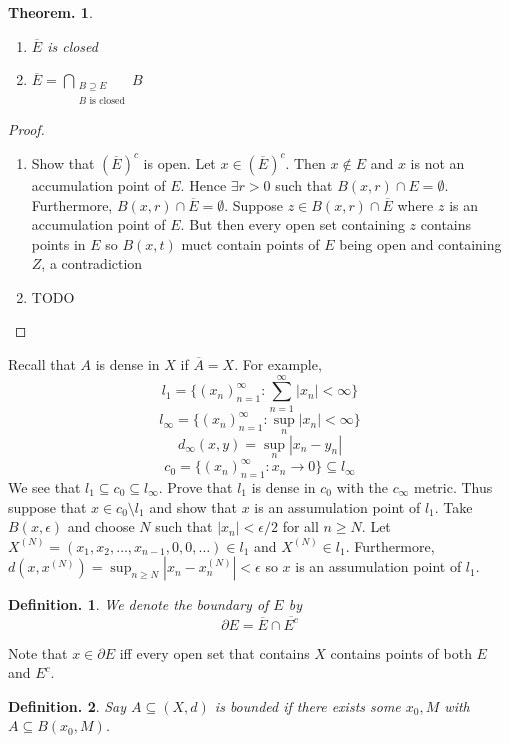 \documentclass[11pt, a4paper]{memoir}
\theoremstyle{change}
\newtheorem{theorem}{Theorem.}[section]
\theoremstyle{plain}
\theoremstyle{nonumberplain}
\newtheorem{definition}{Definition.}
\newtheorem{proof}{Proof}
\DeclareMathOperator{\B}{{\mathcal{B}}}
\numberwithin{equation}{section}
\begin{document}
\begin{theorem}\hspace{1cm}
    \begin{enumerate}
        \item $\overline{E}$ is closed
        \item $\displaystyle\overline{E}=\bigcap_{\substack{B\supseteq E\\B\text{ is closed}}}B$
    \end{enumerate}
\end{theorem}
\begin{proof}\hspace{1cm}
    \begin{enumerate}
        \item Show that $(\overline{E})^c$ is open. Let $x\in(\overline{E})^c$. Then $x\notin E$ and $x$ is not an accumulation
            point of $E$. Hence $\exists r>0$ such that $B(x,r)\cap E=\emptyset$. Furthermore, $B(x,r)\cap\overline{E}=\emptyset$.
            Suppose $z\in B(x,r)\cap\overline{E}$ where $z$ is an accumulation point of $E$. But then every open set
            containing $z$ contains points in $E$ so $B(x,t)$ muct contain points of $E$ being open and containing $Z$,
            a contradiction
        \item TODO
    \end{enumerate}
\end{proof}
Recall that $A$ is dense in $X$ if $\overline{A}=X$. For example,
\[l_1=\{(x_n)_{n=1}^\infty:\sum\limits_{n=1}^\infty|x_n|<\infty\}\]
\[l_\infty=\{(x_n)_{n=1}^\infty:\sup_n|x_n|<\infty\}\]
\[d_\infty(x,y)=\sup_n|x_n-y_n|\]
\[c_0=\{(x_n)_{n=1}^\infty:x_n\to 0\}\subseteq l_\infty\]
We see that $l_1\subseteq c_0\subseteq l_\infty$. Prove that $l_1$ is dense in $c_0$ with the $c_\infty$ metric. Thus
suppose that $x\in c_0\setminus l_1$ and show that $x$ is an assumulation point of $l_1$. Take $B(x,\epsilon)$ and choose $N$
such that $|x_n|<\epsilon/2$ for all $n\geq N$. Let $X^{(N)}=(x_1,x_2,\ldots,x_{n-1},0,0,\ldots)\in l_1$ and $X^{(N)}\in l_1$.
Furthermore, $d(x,x^{(N)})=\sup_{n\geq N}|x_n-x_n^{(N)}|<\epsilon$ so $x$ is an assumulation point of $l_1$.

\begin{definition}
    We denote the boundary of $E$ by
    \[\partial E=\overline{E}\cap\overline{E^c}\]
\end{definition}
Note that $x\in\partial E$ iff every open set that contains $X$ contains points of both $E$ and $E^c$.
\begin{definition}
    Say $A\subseteq(X,d)$ is bounded if there exists some $x_0,M$ with $A\subseteq B(x_0,M)$.
\end{definition}
\end{document}
